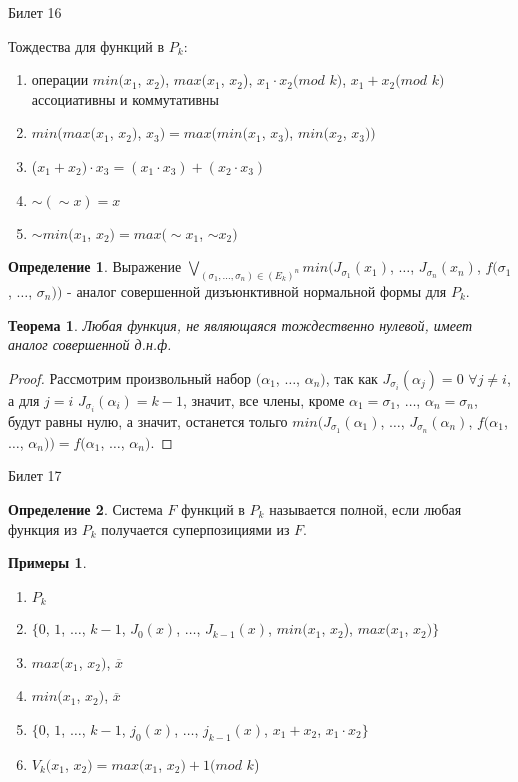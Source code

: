 \documentclass[a4paper, 12pt]{article}
\theoremstyle{definition}
\newtheorem*{definition}{Определение}
\newtheorem*{example}{Примеры}
\theoremstyle{plain}
\newtheorem*{theorem}{Теорема}
\theoremstyle{remark}
\begin{document}
  \begin{center}
    Билет 16
  \end{center}
  Тождества для функций в $P_k$:
  \begin{enumerate}
    \item операции $min(x_1$, $x_2)$, $max(x_1$, $x_2$), $x_1\cdot x_2(mod$ $k)$, $x_1+x_2(mod$ $k)$ ассоциативны и коммутативны
    \item $min(max(x_1$, $x_2)$, $x_3)=max(min(x_1$, $x_3)$, $min(x_2$, $x_3))$
    \item ($x_1+x_2)\cdot x_3=(x_1\cdot x_3)+(x_2\cdot x_3)$
    \item $\sim(\sim x)=x$
    \item $\sim min(x_1$, $x_2)=max(\sim x_1$, $\sim x_2)$
  \end{enumerate}
  \begin{definition}
    Выражение $\bigvee\limits_{(\sigma_1,\ldots,\sigma_n)\in (E_k)^n}min(J_{\sigma_1}(x_1)$, $\ldots$, $J_{\sigma_n}(x_n)$, $f(\sigma_1$, $\ldots$, $\sigma_n))$ - аналог совершенной дизъюнктивной нормальной формы для $P_k$.
  \end{definition}
  \begin{theorem}
    Любая функция, не являющаяся тождественно нулевой, имеет аналог совершенной д.н.ф.
  \end{theorem}
  \begin{proof}
    Рассмотрим произвольный набор $(\alpha_1$, $\ldots$, $\alpha_n)$, так как $J_{\sigma_i}(\alpha_j)=0$ $\forall j\neq i$, а для $j=i$ $J_{\sigma_i}(\alpha_i)=k-1$, значит, все члены, кроме $\alpha_1=\sigma_1$, $\ldots$, $\alpha_n=\sigma_n$, будут равны нулю, а значит, останется тольго $min(J_{\sigma_1}(\alpha_1)$, $\ldots$, $J_{\sigma_n}(\alpha_n)$, $f(\alpha_1$, $\ldots$, $\alpha_n))=f(\alpha_1$, $\ldots$, $\alpha_n)$.
  \end{proof}
  \begin{center}
    Билет 17
  \end{center}
  \begin{definition}
    Система $F$ функций в $P_k$ называется полной, если любая функция из $P_k$ получается суперпозициями из $F$.
  \end{definition}
  \begin{example}
    \begin{enumerate}
      \item $P_k$
      \item $\{0$, $1$, $\ldots$, $k-1$, $J_0(x)$, $\ldots$, $J_{k-1}(x)$, $min(x_1$, $x_2$), $max(x_1$, $x_2)\}$
      \item $max(x_1$, $x_2)$, $\overline{x}$
      \item $min(x_1$, $x_2)$, $\overline{x}$
      \item $\{0$, $1$, $\ldots$, $k-1$, $j_0(x)$, $\ldots$, $j_{k-1}(x)$, $x_1+x_2$, $x_1\cdot x_2\}$
      \item $V_k(x_1$, $x_2)=max(x_1$, $x_2)+1(mod$ $k$)
    \end{enumerate}
  \end{example}
\end{document}
